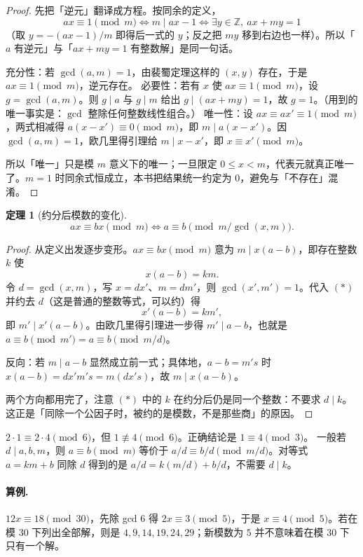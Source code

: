 \documentclass[UTF8,a4paper,11pt,twoside,openright,fontset=fandol]{ctexbook}
\theoremstyle{definition}
\newtheorem{theorem}[definition]{定理}
\newcommand{\Z}{\mathbb Z}
\begin{document}
\begin{proof}
先把「逆元」翻译成方程。按同余的定义，
\[
 ax\equiv1\pmod m\iff m\mid ax-1\iff \exists y\in\Z,\ ax+my=1
\]
（取 $y=-(ax-1)/m$ 即得后一式的 $y$；反之把 $my$ 移到右边也一样）。所以「$a$ 有逆元」与「$ax+my=1$ 有整数解」是同一句话。

充分性：若 $\gcd(a,m)=1$，由裴蜀定理这样的 $(x,y)$ 存在，于是 $ax\equiv1\pmod m$，逆元存在。
必要性：若有 $x$ 使 $ax\equiv1\pmod m$，设 $g=\gcd(a,m)$。则 $g\mid a$ 与 $g\mid m$ 给出 $g\mid(ax+my)=1$，故 $g=1$。（用到的唯一事实是：$\gcd$ 整除任何整数线性组合。）
唯一性：设 $ax\equiv ax'\equiv1\pmod m$，两式相减得 $a(x-x')\equiv0\pmod m$，即 $m\mid a(x-x')$。因 $\gcd(a,m)=1$，欧几里得引理给 $m\mid x-x'$，即 $x\equiv x'\pmod m$。

所以「唯一」只是模 $m$ 意义下的唯一；一旦限定 $0\le x<m$，代表元就真正唯一了。$m=1$ 时同余式恒成立，本书把结果统一约定为 $0$，避免与「不存在」混淆。
\end{proof}
\begin{theorem}[约分后模数的变化]
\[
 ax\equiv bx\pmod m
 \iff a\equiv b\pmod{m/\gcd(x,m)}.
\]
\end{theorem}
\begin{proof}
从定义出发逐步变形。$ax\equiv bx\pmod m$ 意为 $m\mid x(a-b)$，即存在整数 $k$ 使
\[
 x(a-b)=km. \tag{$\ast$}
\]
令 $d=\gcd(x,m)$，写 $x=dx'$、$m=dm'$，则 $\gcd(x',m')=1$。代入 $(\ast)$ 并约去 $d$（这是普通的整数等式，可以约）得
\[
 x'(a-b)=km',
\]
即 $m'\mid x'(a-b)$。由欧几里得引理进一步得 $m'\mid a-b$，也就是 $a\equiv b\pmod{m'}=a\equiv b\pmod{m/d}$。

反向：若 $m\mid a-b$ 显然成立前一式；具体地，$a-b=m's$ 时 $x(a-b)=dx'm's=m(dx's)$，故 $m\mid x(a-b)$。

两个方向都用完了，注意 $(\ast)$ 中的 $k$ 在约分后仍是同一个整数：不要求 $d\mid k$。这正是「同除一个公因子时，被约的是模数，不是那些商」的原因。
\end{proof}

\begin{pitfall}[把整数除法直接搬到同余式中会出错]
$2\cdot1\equiv2\cdot4\pmod6$，但 $1\not\equiv4\pmod6$。正确结论是 $1\equiv4\pmod3$。
一般若 $d\mid a,b,m$，则 $a\equiv b\pmod m$ 等价于 $a/d\equiv b/d\pmod{m/d}$。对等式 $a=km+b$ 同除 $d$ 得到的是 $a/d=k(m/d)+b/d$，不需要 $d\mid k$。
\end{pitfall}
\paragraph{算例.} $12x\equiv18\pmod{30}$，先除 gcd $6$ 得 $2x\equiv3\pmod5$，于是 $x\equiv4\pmod5$。若在模 $30$ 下列出全部解，则是 $4,9,14,19,24,29$；新模数为 $5$ 并不意味着在模 $30$ 下只有一个解。
\end{document}
